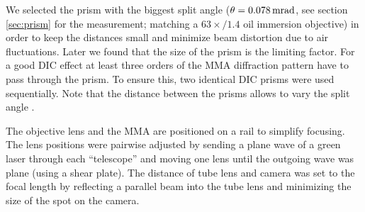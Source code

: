 We selected the prism with the biggest split angle
($\theta=\unit[0.078]{mrad}$, see section \ref{sec:prism} for the
measurement; matching a $63\times/1.4$ oil immersion objective) in
order to keep the distances small and minimize beam distortion due to
air fluctuations. Later we found that the size of the prism is the
limiting factor. For a good DIC effect at least three orders of the
MMA diffraction pattern have to pass through the prism. To ensure
this, two identical DIC prisms were used sequentially. Note that the
distance between the prisms allows to vary the split angle
\citep{Schwertner2008}.

The objective lens and the MMA are positioned on a rail to simplify
focusing. The lens positions were pairwise adjusted by sending a
plane wave of a green laser through each ``telescope'' and moving one
lens until the outgoing wave was plane (using a shear plate). The
distance of tube lens and camera was set to the focal length by
reflecting a parallel beam into the tube lens and minimizing the size
of the spot on the camera.

